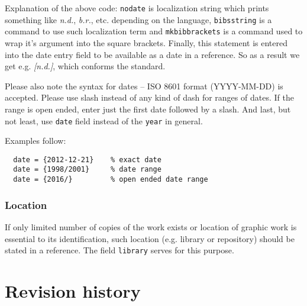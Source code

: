 \documentclass[a4paper,10pt]{ltxdockit}
\def\t|#1|{\texttt{#1}}
\begin{document}
Explanation of the above code:
\t|nodate| is localization string which prints something like
\textit{n.d.}, \textit{b.r.}, etc. depending on the language,
\t|bibsstring| is a command to use such localization term and
\t|mkbibbrackets| is a command used to wrap it's argument into
the square brackets. Finally, this statement is entered into
the date entry field to be available as a date in a reference.
So as a result we get e.g. \textit{[n.d.]}, which conforms
the standard.

Please also note the syntax for dates -- ISO 8601 format
(YYYY-MM-DD) is accepted. Please use slash instead of
any kind of dash for ranges of dates. If the range is
open ended, enter just the first date followed by a slash.
And last, but not least, use \t|date| field instead of
the \t|year| in general.

Examples follow:

\begin{verbatim}
  date = {2012-12-21}    % exact date
  date = {1998/2001}     % date range
  date = {2016/}         % open ended date range
\end{verbatim}

\subsubsection{Location}

If only limited number of copies of the work exists or
location of graphic work is essential to its identification,
such location (e.g. library or repository) should be stated
in a reference. The field \t|library| serves for this purpose.

\nocite{*}
\printbibliography[title={Reference bibliography},heading={bibnumbered}]


\section{Revision history}
\end{document}

